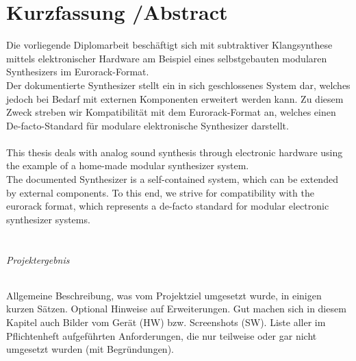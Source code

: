 \chapter*{Kurzfassung /Abstract }
\label{cha:abstract}

Die vorliegende Diplomarbeit beschäftigt sich mit subtraktiver Klangsynthese mittels elektronischer Hardware am Beispiel eines selbstgebauten modularen Synthesizers im Eurorack-Format. \\

Der dokumentierte Synthesizer stellt ein in sich geschlossenes System dar, welches jedoch bei Bedarf mit externen Komponenten erweitert werden kann. Zu diesem Zweck streben wir Kompatibilität mit dem Eurorack-Format an, welches einen De-facto-Standard für modulare elektronische Synthesizer darstellt. \\ \\


This thesis deals with analog sound synthesis through electronic hardware using the example of a home-made modular synthesizer system. \\

The documented Synthesizer is a self-contained system, which can be extended by external components. To this end, we strive for compatibility with the eurorack format, which represents a de-facto standard for modular electronic synthesizer systems. \\ \\


\subparagraph{Projektergebnis}

Allgemeine Beschreibung, was vom Projektziel umgesetzt wurde, in einigen kurzen Sätzen. Optional Hinweise auf Erweiterungen. Gut machen sich in diesem Kapitel auch Bilder vom Gerät (HW) bzw. Screenshots (SW).
Liste aller im Pflichtenheft aufgeführten Anforderungen, die nur teilweise oder gar nicht umgesetzt wurden (mit Begründungen).
